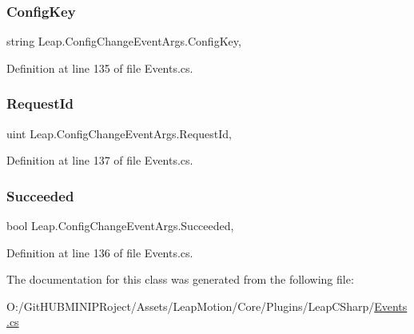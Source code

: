 \subsubsection{\texorpdfstring{ConfigKey}{ConfigKey}}
{\footnotesize\ttfamily string Leap.\+Config\+Change\+Event\+Args.\+Config\+Key\hspace{0.3cm}{\ttfamily [get]}, {\ttfamily [set]}}



Definition at line 135 of file Events.\+cs.

\mbox{\label{class_leap_1_1_config_change_event_args_aab8a8f32a9a3e45499f01d73855b2284}} 
\subsubsection{\texorpdfstring{RequestId}{RequestId}}
{\footnotesize\ttfamily uint Leap.\+Config\+Change\+Event\+Args.\+Request\+Id\hspace{0.3cm}{\ttfamily [get]}, {\ttfamily [set]}}



Definition at line 137 of file Events.\+cs.

\mbox{\label{class_leap_1_1_config_change_event_args_a2f9277cd05efe549b4da2d9f45afd7c9}} 
\subsubsection{\texorpdfstring{Succeeded}{Succeeded}}
{\footnotesize\ttfamily bool Leap.\+Config\+Change\+Event\+Args.\+Succeeded\hspace{0.3cm}{\ttfamily [get]}, {\ttfamily [set]}}



Definition at line 136 of file Events.\+cs.



The documentation for this class was generated from the following file\+:\begin{DoxyCompactItemize}
\item 
O\+:/\+Git\+H\+U\+B\+M\+I\+N\+I\+P\+Roject/\+Assets/\+Leap\+Motion/\+Core/\+Plugins/\+Leap\+C\+Sharp/\mbox{\hyperlink{_events_8cs}{Events.\+cs}}\end{DoxyCompactItemize}
